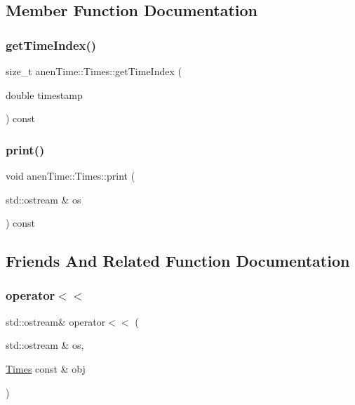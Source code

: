 \subsection{Member Function Documentation}
\mbox{\label{classanen_time_1_1_times_a9df2a7b0c4211d262853b8facc3f4163}} 
\subsubsection{\texorpdfstring{get\+Time\+Index()}{getTimeIndex()}}
{\footnotesize\ttfamily size\+\_\+t anen\+Time\+::\+Times\+::get\+Time\+Index (\begin{DoxyParamCaption}\item[{double}]{timestamp }\end{DoxyParamCaption}) const}

\mbox{\label{classanen_time_1_1_times_aec5c8186b68d51239dbee83a7303e5d0}} 
\subsubsection{\texorpdfstring{print()}{print()}}
{\footnotesize\ttfamily void anen\+Time\+::\+Times\+::print (\begin{DoxyParamCaption}\item[{std\+::ostream \&}]{os }\end{DoxyParamCaption}) const}



\subsection{Friends And Related Function Documentation}
\mbox{\label{classanen_time_1_1_times_a0c37c7d9833e9b02d1a219555f55fe34}} 
\subsubsection{\texorpdfstring{operator$<$$<$}{operator<<}}
{\footnotesize\ttfamily std\+::ostream\& operator$<$$<$ (\begin{DoxyParamCaption}\item[{std\+::ostream \&}]{os,  }\item[{\mbox{\hyperlink{classanen_time_1_1_times}{Times}} const \&}]{obj }\end{DoxyParamCaption})\hspace{0.3cm}{\ttfamily [friend]}}



